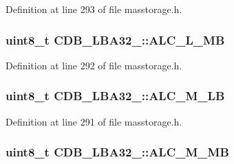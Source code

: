 \-Definition at line 293 of file masstorage.\-h.

\hypertarget{struct_c_d_b___l_b_a32__16_afc2671b54d66b5b06fba9a73c2c4cad9}{
\subsubsection[{\-A\-L\-C\-\_\-\-L\-\_\-\-M\-B}]{\setlength{\rightskip}{0pt plus 5cm}uint8\-\_\-t {\bf \-C\-D\-B\-\_\-\-L\-B\-A32\-\_\-::\-A\-L\-C\-\_\-\-L\-\_\-\-M\-B}}}\label{struct_c_d_b___l_b_a32__16_afc2671b54d66b5b06fba9a73c2c4cad9}


\-Definition at line 292 of file masstorage.\-h.

\hypertarget{struct_c_d_b___l_b_a32__16_a57fc0fb5cba1f737be25721e7f34f11f}{
\subsubsection[{\-A\-L\-C\-\_\-\-M\-\_\-\-L\-B}]{\setlength{\rightskip}{0pt plus 5cm}uint8\-\_\-t {\bf \-C\-D\-B\-\_\-\-L\-B\-A32\-\_\-::\-A\-L\-C\-\_\-\-M\-\_\-\-L\-B}}}\label{struct_c_d_b___l_b_a32__16_a57fc0fb5cba1f737be25721e7f34f11f}


\-Definition at line 291 of file masstorage.\-h.

\hypertarget{struct_c_d_b___l_b_a32__16_ab03ff411de8da944cbaba39bd33ae7bc}{
\subsubsection[{\-A\-L\-C\-\_\-\-M\-\_\-\-M\-B}]{\setlength{\rightskip}{0pt plus 5cm}uint8\-\_\-t {\bf \-C\-D\-B\-\_\-\-L\-B\-A32\-\_\-::\-A\-L\-C\-\_\-\-M\-\_\-\-M\-B}}}\label{struct_c_d_b___l_b_a32__16_ab03ff411de8da944cbaba39bd33ae7bc}


